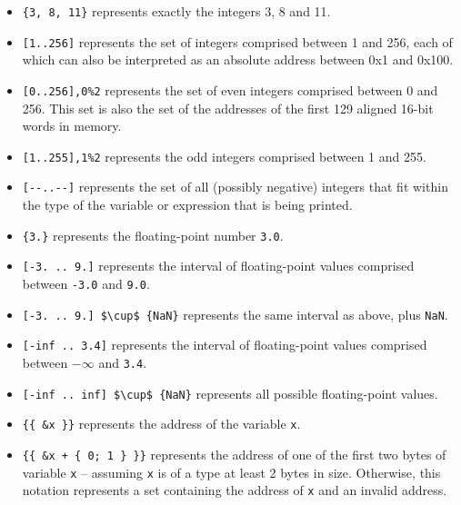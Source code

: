 \documentclass[web]{frama-c-book}
\begin{document}
\begin{itemize}

\item \lstinline|{3, 8, 11}| represents exactly the integers 3, 8 and 11.

\item \lstinline|[1..256]| represents the set of integers comprised between 1 and 256, each of which can also be interpreted as an absolute address between
0x1 and 0x100.

\item \lstinline|[0..256],0%2|
      represents the set of even integers comprised between 0 and 256.
This set is also the set of the addresses of the first 129 aligned 16-bit words
in memory.

\item \lstinline|[1..255],1%2|
      represents the odd integers comprised between 1 and 255.

\item \lstinline|[--..--]| represents the set of all (possibly negative)
integers that fit within the type of the variable or expression that is
being printed.

\item \lstinline|{3.}| represents the floating-point number \lstinline|3.0|.

\item \lstinline|[-3. .. 9.]| represents the interval of floating-point values
comprised between \lstinline|-3.0| and \lstinline|9.0|.

\item \lstinline|[-3. .. 9.] $\cup$ {NaN}| represents the same
  interval as above, plus \lstinline|NaN|.

\item \lstinline|[-inf .. 3.4]| represents the interval of
  floating-point values comprised between $-\infty$ and \lstinline|3.4|.

\item \lstinline|[-inf .. inf] $\cup$ {NaN}| represents
  all possible floating-point values.

\item \lstinline|{{ &x }}| represents the address of the variable \lstinline|x|.

\item \lstinline|{{ &x + { 0; 1 } }}|
  represents the address of one of the first two bytes of variable
      \lstinline|x| -- assuming \lstinline|x| is of a type at least 2 bytes in size.
 Otherwise, this notation represents a set containing the address of
\lstinline|x| and an invalid address.


\end{itemize}
\end{document}
